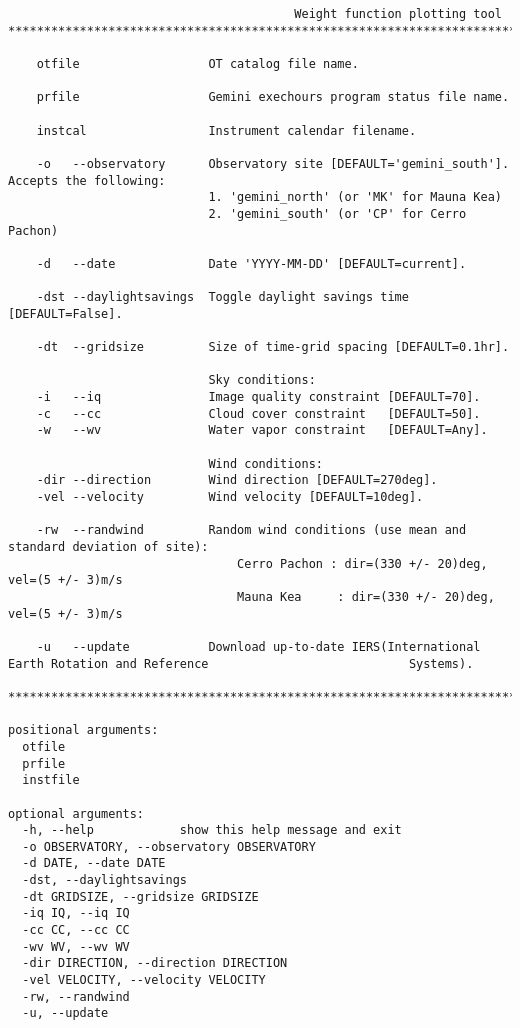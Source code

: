 \documentclass{article}
\begin{document}
\begin{lstlisting}
                                        Weight function plotting tool
*****************************************************************************************************               

    otfile                  OT catalog file name.

    prfile                  Gemini exechours program status file name.

    instcal                 Instrument calendar filename.

    -o   --observatory      Observatory site [DEFAULT='gemini_south']. Accepts the following:
                            1. 'gemini_north' (or 'MK' for Mauna Kea)
                            2. 'gemini_south' (or 'CP' for Cerro Pachon)

    -d   --date             Date 'YYYY-MM-DD' [DEFAULT=current].

    -dst --daylightsavings  Toggle daylight savings time [DEFAULT=False].

    -dt  --gridsize         Size of time-grid spacing [DEFAULT=0.1hr].

                            Sky conditions:
    -i   --iq               Image quality constraint [DEFAULT=70].
    -c   --cc               Cloud cover constraint   [DEFAULT=50].
    -w   --wv               Water vapor constraint   [DEFAULT=Any].

                            Wind conditions:
    -dir --direction        Wind direction [DEFAULT=270deg].
    -vel --velocity         Wind velocity [DEFAULT=10deg].

    -rw  --randwind         Random wind conditions (use mean and standard deviation of site):
                                Cerro Pachon : dir=(330 +/- 20)deg, vel=(5 +/- 3)m/s
                                Mauna Kea     : dir=(330 +/- 20)deg, vel=(5 +/- 3)m/s

    -u   --update           Download up-to-date IERS(International Earth Rotation and Reference                            Systems).

*****************************************************************************************************                        

positional arguments:
  otfile
  prfile
  instfile

optional arguments:
  -h, --help            show this help message and exit
  -o OBSERVATORY, --observatory OBSERVATORY
  -d DATE, --date DATE
  -dst, --daylightsavings
  -dt GRIDSIZE, --gridsize GRIDSIZE
  -iq IQ, --iq IQ
  -cc CC, --cc CC
  -wv WV, --wv WV
  -dir DIRECTION, --direction DIRECTION
  -vel VELOCITY, --velocity VELOCITY
  -rw, --randwind
  -u, --update

\end{lstlisting}
\end{document}

